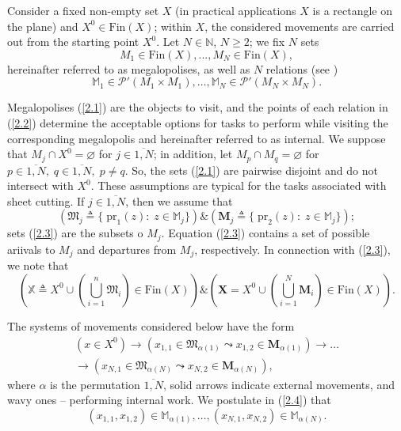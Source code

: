 \label{sec:2}

Consider a fixed non-empty set
$X$
(in practical applications
\cite{4}
$X$
is a rectangle on the plane)
and $X^0 \in \mathrm{Fin}(X)$;
within $ X $, the considered movements are carried out
from the starting point
$ X ^ 0 $.
Let $N \in \mathbb{N}$,
$N\ge 2$;
we fix $N$ sets
\begin{equation}\label{2.1}
M_1 \in \mathrm{Fin}(X),...,M_N \in \mathrm{Fin}(X),
\end{equation}
hereinafter referred to as megalopolises,
as well as
$N$
relations
(see \cite[chapter II, $\S$4]{15})
\begin{equation}\label{2.2}
\mathbb{M}_1 \in \mathcal{P}'(M_1 \times M_1), \dots ,
    \mathbb{M}_N \in \mathcal{P}'(M_N \times M_N).
\end{equation}

Megalopolises (\ref{2.1})
are the objects to visit,
and the points of each relation in (\ref{2.2})
determine the acceptable options for tasks to perform
while visiting the corresponding megalopolis
and hereinafter referred to as internal.
We suppose that
$M_j \cap X^0 = \varnothing$
for
$j \in \overline{1,N}$;
in addition, let
$M_p \cap M_q = \varnothing$
for
$p \in \overline{1,N},\;q \in \overline{1,N},\;p \ne q$.
So,
the sets (\ref{2.1})
are pairwise disjoint and do not intersect with
$ X ^ 0 $.
These assumptions are typical for the tasks
associated with sheet cutting.
If $j \in \overline{1,N}$,
then we assume that
\begin{equation}\label{2.3}
    (\mathfrak{M}_j {\triangleq}
    \{\;\mathrm{pr}_1(z):\;z \in \mathbb{M}_j\})
    \& (\mathbf{M}_j {\triangleq}
    \{\;\mathrm{pr}_2(z):\;z \in \mathbb{M}_j\})
    ;
\end{equation}
sets (\ref{2.3})
are the subsets o
$M_j$.
Equation (\ref{2.3})
contains a set of possible ariivals to
$M_j$
and departures from $M_j$,
respectively.
In connection with
 (\ref{2.3}),
we note that
$$
(\mathbb{X} {\triangleq} X^0 \cup
(\bigcup\limits_{i=1}^n \mathfrak{M}_i) \in \mathrm{Fin}(X))
\& (\mathbf{X} = X^0 \cup (\bigcup\limits_{i=1}^N \mathbf{M}_i) \in \mathrm{Fin}(X)).
$$

The systems of movements considered below have the form
\begin{equation}\label{2.4}
  \begin{aligned}
    (x \in X^0)
    \to
    (x_{1,1} \in \mathfrak{M}_{\alpha(1)} \leadsto x_{1,2} \in \mathbf{M}_{\alpha(1)})
    \to \dots \\
    \to
    (x_{N,1} \in \mathfrak{M}_{\alpha(N)} \leadsto x_{N,2} \in \mathbf{M}_{\alpha(N)}),
  \end{aligned}
\end{equation}
where
$\alpha$ is the permutation $\overline{1,N}$,
solid arrows indicate external movements,
and wavy ones -- performing internal work.
We postulate in (\ref{2.4}) that
\begin{equation}\label{2.5}
  (x_{1,1},x_{1,2}) \in \mathbb{M}_{\alpha(1)},
  \dots,
  (x_{N,1},x_{N,2}) \in \mathbb{M}_{\alpha(N)}.
\end{equation}

